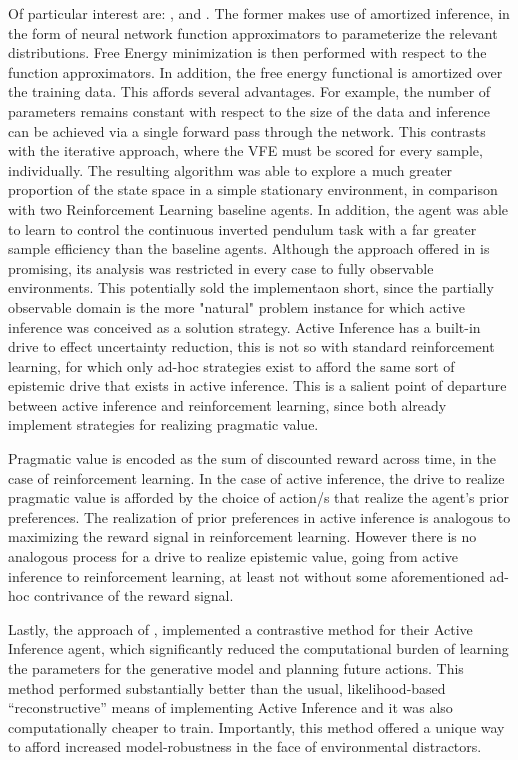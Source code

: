 \documentclass[onecolumn]{IEEEtran}
\begin{document}
Of particular interest are: \textcite{Scaling-AIF}, \textcite{Bayesian-Policy-Selection-Using-AIF} and \textcite{Contrastive-AIF}. The former makes use of amortized inference, in the form of neural network function approximators to parameterize the relevant distributions. Free Energy minimization is then performed with respect to the function approximators. In addition, the free energy functional is amortized over the training data. This affords several advantages. For example, the number of parameters remains constant with respect to the size of the data and inference can be achieved via a single forward pass through the network. This contrasts with the iterative approach, where the VFE must be scored for every sample, individually. The resulting algorithm was able to explore a much greater proportion of the state space in a simple stationary environment, in comparison with two Reinforcement Learning baseline agents. In addition, the agent was able to learn to control the continuous inverted pendulum task with a far greater sample efficiency than the baseline agents. Although the approach offered in \textcite{Scaling-AIF} is promising, its analysis was restricted in every case to fully observable environments. This potentially sold the implementaon short, since the partially observable domain is the more "natural" problem instance for which active inference was conceived as a solution strategy. Active Inference has a built-in drive to effect uncertainty reduction, this is not so with standard reinforcement learning, for which only ad-hoc strategies exist to afford the same sort of epistemic drive that exists in active inference. This is a salient point of departure between active inference and reinforcement learning, since both already implement strategies for realizing pragmatic value. 

Pragmatic value is encoded as the sum of discounted reward across time, in the case of reinforcement learning. In the case of active inference, the drive to realize pragmatic value is afforded by the choice of action/s that realize the agent's prior preferences. The realization of prior preferences in active inference is analogous to maximizing the reward signal in reinforcement learning. However there is no analogous process for a drive to realize epistemic value, going from active inference to reinforcement learning, at least not without some aforementioned ad-hoc contrivance of the reward signal. 

Lastly, the approach of \textcite{Contrastive-AIF}, implemented a contrastive method for their Active Inference agent, which significantly reduced the computational burden of learning the parameters for the generative model and planning future actions. This method performed substantially better than the usual, likelihood-based ``reconstructive'' means of implementing Active Inference and it was also computationally cheaper to train. Importantly, this method offered a unique way to afford increased model-robustness in the face of environmental distractors. 
\end{document}
